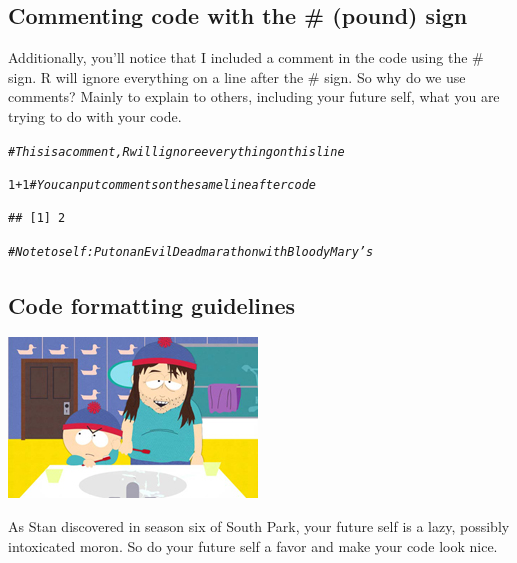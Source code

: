 \documentclass{tufte-book}\usepackage[]{graphicx}\usepackage[]{color}
\makeatletter
\newcommand{\hlnum}[1]{\textcolor[rgb]{0.686,0.059,0.569}{#1}}%
\newcommand{\hlcom}[1]{\textcolor[rgb]{0.678,0.584,0.686}{\textit{#1}}}%
\newcommand{\hlopt}[1]{\textcolor[rgb]{0,0,0}{#1}}%
\newenvironment{kframe}{%
 \def\at@end@of@kframe{}%
 \ifinner\ifhmode%
  \def\at@end@of@kframe{\end{minipage}}%
  \begin{minipage}{\columnwidth}%
 \fi\fi%
 \def\FrameCommand##1{\hskip\@totalleftmargin \hskip-\fboxsep
 \colorbox{shadecolor}{##1}\hskip-\fboxsep
     \hskip-\linewidth \hskip-\@totalleftmargin \hskip\columnwidth}%
 \MakeFramed {\advance\hsize-\width
   \@totalleftmargin\z@ \linewidth\hsize
   \@setminipage}}%
 {\par\unskip\endMakeFramed%
 \at@end@of@kframe}
\newenvironment{knitrout}{}{} %
\makeatother
\begin{document}
\subsection{Commenting code with the # (pound) sign}

Additionally, you'll notice that I included a comment in the code using the \# sign. R will ignore everything on a line after the \# sign. So why do we use comments? Mainly to explain to others, including your future self, what you are trying to do with your code.

\begin{knitrout}
\color{fgcolor}\begin{kframe}
\begin{alltt}
\hlcom{# This is a comment, R will ignore everything on this line}

\hlnum{1} \hlopt{+} \hlnum{1} \hlcom{# You can put comments on the same line after code}
\end{alltt}
\begin{verbatim}
## [1] 2
\end{verbatim}
\begin{alltt}
\hlcom{# Note to self: Put on an Evil Dead marathon with Bloody Mary's}
\end{alltt}
\end{kframe}
\end{knitrout}

\subsection{Code formatting guidelines}

\begin{marginfigure}
\includegraphics[width=\linewidth]{futureself.jpg}
\caption{As Stan discovered in season six of South Park, your future self is a lazy, possibly intoxicated moron. So do your future self a favor and make your code look nice.}
\end{marginfigure}
\end{document}
